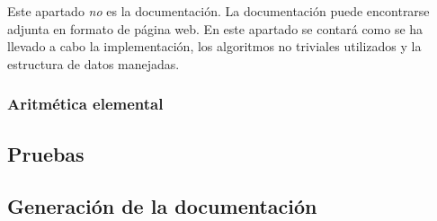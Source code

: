 \begin{nota}
    Este apartado \emph{no} es la documentación. La documentación puede encontrarse adjunta en formato de página web. En este apartado se contará como se ha llevado a cabo la implementación, los algoritmos no triviales utilizados y la estructura de datos manejadas.
\end{nota}

\subsubsection{Aritmética elemental}
\label{subs:Aritmética elemental}

\subsection{Pruebas}
\label{sub:Pruebas}


\subsection{Generación de la documentación}
\label{sub:Generación de la documentación}


